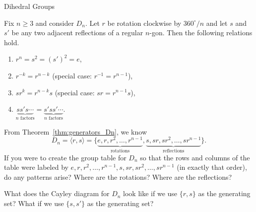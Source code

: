 \begin{section}{Dihedral Groups}
\begin{theorem}
Fix $n\geq 3$ and consider $D_n$. Let $r$ be rotation clockwise by $360^{\circ}/n$  and let $s$ and $s'$ be any two adjacent reflections of a regular $n$-gon.  Then the following relations hold.
\begin{enumerate}[label=\textrm{(\alph*)}]
\item $r^n = s^2 = (s')^2 =e$,
\item $r^{-k} = r^{n-k}$ (special case: $r^{-1}=r^{n-1}$),
\item $sr^k=r^{n-k}s$ (special case: $sr=r^{n-1}s$),
\item $\underbrace{ss's\cdots}_{n\text{ factors}}=\underbrace{s'ss'\cdots}_{n\text{ factors}}$.
\end{enumerate}
\end{theorem}

\begin{problem}
From Theorem~\ref{thm:generators_Dn}, we know
\[
D_n=\langle r,s\rangle =\{\underbrace{e,r,r^2,\ldots, r^{n-1}}_{\text{rotations}},\underbrace{s,sr,sr^2,\ldots,sr^{n-1}}_{\text{reflections}}\}.
\]
If you were to create the group table for $D_n$ so that the rows and columns of the table were labeled by $e,r,r^2,\ldots, r^{n-1},s,sr,sr^2,\ldots,sr^{n-1}$ (in exactly that order), do any patterns arise?  Where are the rotations? Where are the reflections?
\end{problem}

\begin{problem}
What does the Cayley diagram for $D_n$ look like if we use $\{r,s\}$ as the generating set?  What if we use $\{s,s'\}$ as the generating set?
\end{problem}

\end{section}

